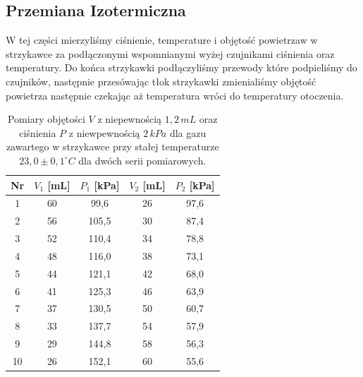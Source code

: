 \documentclass[12pt]{article}
\begin{document}
\subsection{Przemiana Izotermiczna}
W tej części mierzyliśmy ciśnienie, temperature i objętość powietrzaw w strzykawce za podłączonymi wspomnianymi wyżej czujnikami ciśnienia oraz temperatury. Do końca strzykawki podłączyliśmy przewody które podpieliśmy do czujników, następnie przesówając tłok strzykawki zmienialiśmy objętość powietrza następnie czekając aż temperatura wróci do temperatury otoczenia.

\begin{table}[H]
    \centering
    \begin{tabular}{c|cc|cc}
        \toprule
        \textbf{Nr} &
        $V_1$ [mL] & $P_1$ [kPa] &
        $V_2$ [mL] & $P_2$ [kPa] \\
        \midrule
        1  & 60 & 99{,}6  & 26 & 97{,}6  \\
        2  & 56 & 105{,}5 & 30 & 87{,}4  \\
        3  & 52 & 110{,}4 & 34 & 78{,}8  \\
        4  & 48 & 116{,}0 & 38 & 73{,}1  \\
        5  & 44 & 121{,}1 & 42 & 68{,}0  \\
        6  & 41 & 125{,}3 & 46 & 63{,}9  \\
        7  & 37 & 130{,}5 & 50 & 60{,}7  \\
        8  & 33 & 137{,}7 & 54 & 57{,}9  \\
        9  & 29 & 144{,}8 & 58 & 56{,}3  \\
        10 & 26 & 152{,}1 & 60 & 55{,}6  \\
        \bottomrule
    \end{tabular}
    \caption{Pomiary objętości $V$ z niepewnością $1{,}2 \, mL$ oraz ciśnienia $P$ z niewpewnością $2 \, kPa$ dla gazu zawartego w strzykawce przy stałej temperaturze $23{,}0 \pm 0{,}1 ^\circ C$ dla dwóch serii pomiarowych.}
    \label{tab:syringe_data_with_updated_values}
\end{table}
\end{document}
